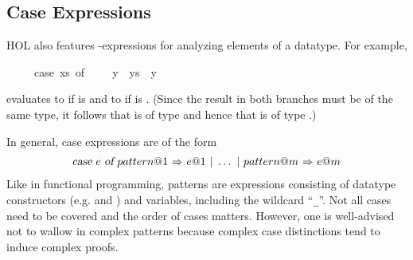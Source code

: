 %
\begin{isabellebody}%
\def\isabellecontext{case{\isaliteral{5F}{\isacharunderscore}}exprs}%
%
\isadelimtheory
%
\endisadelimtheory
%
\isatagtheory
%
\endisatagtheory
{\isafoldtheory}%
%
\isadelimtheory
%
\endisadelimtheory
%
\begin{isamarkuptext}%
\subsection{Case Expressions}
\label{sec:case-expressions}%
HOL also features -expressions for analyzing
elements of a datatype. For example,
\begin{isabelle}%
\ \ \ \ \ case\ xs\ of\ {}{}\ {}\ {}{}\ {}\ y\ {}\ ys\ {}\ y%
\end{isabelle}
evaluates to  if  is  and to  if 
 is . (Since the result in both branches must be of
the same type, it follows that  is of type  and hence
that  is of type .)

In general, case expressions are of the form
\[
\begin{array}{c}
\isa{case}~e~\isa{of}\ pattern@1~\isa{{\isaliteral{5C3C52696768746172726F773E}{\isasymRightarrow}}}~e@1\ \isa{{\isaliteral{7C}{\isacharbar}}}\ \dots\
 \isa{{\isaliteral{7C}{\isacharbar}}}~pattern@m~\isa{{\isaliteral{5C3C52696768746172726F773E}{\isasymRightarrow}}}~e@m
\end{array}
\]
Like in functional programming, patterns are expressions consisting of
datatype constructors (e.g.  and )
and variables, including the wildcard ``\verb$_$''.
Not all cases need to be covered and the order of cases matters.
However, one is well-advised not to wallow in complex patterns because
complex case distinctions tend to induce complex proofs.


\end{isamarkuptext}
\end{isabellebody}

